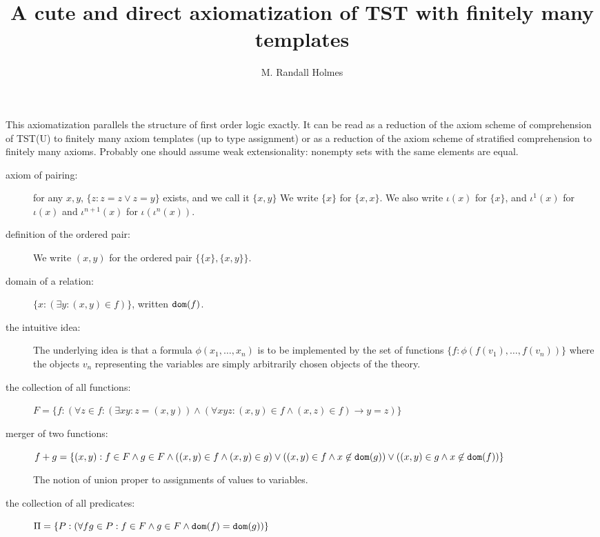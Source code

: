 \documentclass[12pt]{article}
\title{A cute and direct axiomatization of TST with finitely many templates}
\author{M. Randall Holmes}
\begin{document}
\maketitle
This axiomatization parallels the structure of first order logic exactly.   It can be read
as a reduction of the axiom scheme of comprehension of TST(U)  to finitely many axiom templates (up to type assignment) or as a reduction of the axiom scheme of stratified comprehension to finitely many axioms.  Probably one should assume weak extensionality:  nonempty sets with the same elements are equal.

\begin{description}

\item[axiom of pairing:]  for any $x,y$, $\{z:z = z \vee z=y\}$ exists, and we call it $\{x,y\}$  We write $\{x\}$ for $\{x,x\}$.  We also write $\iota(x)$ for
$\{x\}$, and $\iota^1(x)$ for $\iota(x)$ and $\iota^{n+1}(x)$ for $\iota(\iota^n(x))$.

\item[definition of the ordered pair:]  We write $(x,y)$ for the ordered pair $\{\{x\},\{x,y\}\}$.

\item[domain of a relation:]  $\{x:(\exists y:(x,y) \in f)\}$, written ${\tt dom}(f)$. 

\item[the intuitive idea:]  The underlying idea is that a formula $\phi(x_1,\ldots,x_n)$ is to be implemented by
the set of functions $\{f:\phi(f(v_1),\ldots,f(v_n))\}$ where the objects $v_n$ representing the variables are simply arbitrarily chosen objects of the theory.

\item[the collection of all functions:]  $F = \{f:(\forall z \in f:(\exists xy:z = (x,y)) \wedge (\forall xyz:(x,y) \in f \wedge (x,z) \in f) \rightarrow y=z)\}$

\item[merger of two functions:]  $f+g = \{(x,y):f \in F \wedge g \in F \wedge ((x,y) \in f \wedge (x,y) \in g) \vee  ((x,y) \in f \wedge x \not\in {\tt dom}(g)) \vee ((x,y) \in g \wedge x \not\in {\tt dom}(f))\}$

The notion of union proper to assignments of values to variables.

\item[the collection of all predicates:]  $\Pi = \{P:(\forall fg \in P:f\in F \wedge g\in F \wedge {\tt dom}(f) = {\tt dom}(g))\}$


\end{description}
\end{document}
